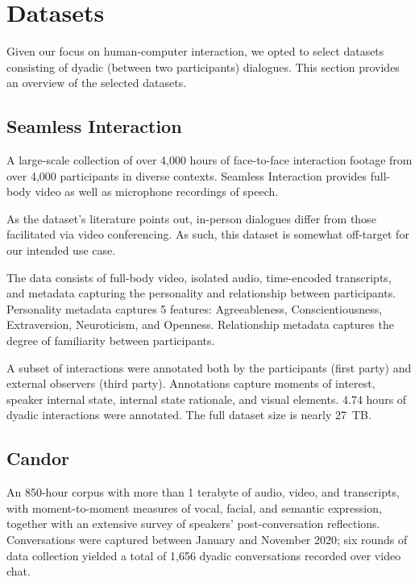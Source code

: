 \documentclass[12pt, a4paper]{article}
\begin{document}
\section{Datasets}
\label{app:datasets}

Given our focus on human-computer interaction, we opted to select datasets consisting of dyadic (between two participants) dialogues. This section provides an overview of the selected datasets.

\subsection{Seamless Interaction}

A large-scale collection of over 4,000 hours of face-to-face interaction footage from over 4,000 participants in diverse contexts. Seamless Interaction provides full-body video as well as microphone recordings of speech.

As the dataset's literature points out, in-person dialogues differ from those facilitated via video conferencing. As such, this dataset is somewhat off-target for our intended use case.

The data consists of full-body video, isolated audio, time-encoded transcripts, and metadata capturing the personality and relationship between participants. Personality metadata captures 5 features: Agreeableness, Conscientiousness, Extraversion, Neuroticism, and Openness. Relationship metadata captures the degree of familiarity between participants.

A subset of interactions were annotated both by the participants (first party) and external observers (third party). Annotations capture moments of interest, speaker internal state, internal state rationale, and visual elements. 4.74 hours of dyadic interactions were annotated. The full dataset size is nearly 27~TB.

\subsection{Candor}

An 850-hour corpus with more than 1 terabyte of audio, video, and transcripts, with moment-to-moment measures of vocal, facial, and semantic expression, together with an extensive survey of speakers' post-conversation reflections. Conversations were captured between January and November 2020; six rounds of data collection yielded a total of 1,656 dyadic conversations recorded over video chat.
\end{document}
